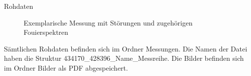 \documentclass[twoside]{protokoll}
\begin{document}
\begin{aufgabe}{Rohdaten}
\begin{figure}[H]
    \caption{Exemplarische Messung mit Störungen und zugehörigen Fouierspektren}
  \centering
\end{figure}
\begin{figure}[H]
  \centering
\end{figure}

Sämtlichen Rohdaten befinden sich im Ordner Messungen. Die Namen der Datei haben die 
Struktur 434170\_428396\_Name\_Messreihe.
Die Bilder befinden sich im Ordner Bilder als PDF abgespeichert.
\end{aufgabe}
\end{document}
